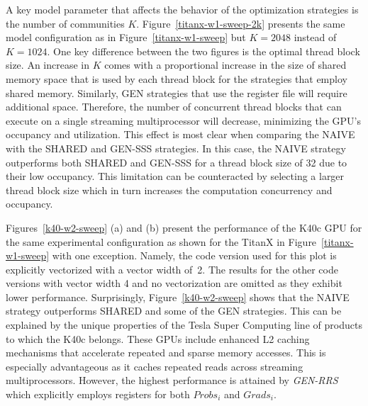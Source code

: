 A key model parameter that affects the behavior of the optimization strategies
is the number of communities $K$. Figure~\ref{titanx-w1-sweep-2k} presents the
same model configuration as in Figure~\ref{titanx-w1-sweep} but $K=2048$
instead of $K=1024$. One key difference between the two figures is the optimal
thread block size. An increase in $K$ comes with a proportional increase in
the size of shared memory space that is used by each thread block for the
strategies that employ shared memory. Similarly, GEN strategies that use the
register file will require additional space. Therefore, the number of
concurrent thread blocks that can execute on a single streaming multiprocessor
will decrease, minimizing the GPU's occupancy and utilization. This effect is
most clear when comparing the NAIVE with the SHARED and GEN-SSS strategies. In
this case, the NAIVE strategy outperforms both SHARED and GEN-SSS for a
thread block
size of 32 due to their low occupancy. This limitation can be counteracted by
selecting a larger thread block size which in turn increases the computation
concurrency and occupancy.

\begin{figure*}[t]	%
  \centering
  \caption{Execution time of 1000 \textit{update\_phi} invocations using the K40c GPU, with
  explicit kernel vectorization of width 2, across a sweep of
  \textit{update\_phi} thread block
  sizes. Relevant model parameters: K=1024, M=4096, n=32.}
  \label{k40-w2-sweep}
\end{figure*}

Figures~\ref{k40-w2-sweep} (a) and (b) present the performance of the K40c GPU
for the same experimental configuration as shown for the TitanX in
Figure~\ref{titanx-w1-sweep} with one exception. Namely, the code version used
for this plot is explicitly vectorized with a vector width of~2. The results
for the other code versions with vector width 4 and no vectorization are
omitted as they exhibit lower performance.
%
Surprisingly, Figure~\ref{k40-w2-sweep} shows that the NAIVE strategy
outperforms SHARED and some of the GEN strategies. This can be explained by the
unique properties of the Tesla Super Computing line of products to which the
K40c belongs. These GPUs include enhanced L2 caching mechanisms that
accelerate repeated and sparse memory accesses. This is especially advantageous
as it caches repeated reads across streaming multiprocessors. However, the
highest performance is attained by \textit{GEN-RRS} which explicitly employs
registers for both $Probs_i$ and $Grads_i$.

